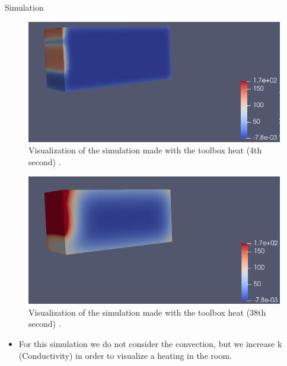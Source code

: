 \begin{frame}[allowframebreaks]{Simulation}
\begin{minipage}{0.48\linewidth}
    \begin{figure}
        \centering
        \includegraphics[width=\linewidth]{"images/enkf/Simulation_1.jpg"}
        \caption{Visualization of the simulation made with the toolbox heat (4th second) .}
    \end{figure}
\end{minipage} \;
\begin{minipage}{0.46\linewidth}
    \begin{figure}
        \centering
        \includegraphics[width=\linewidth]{"images/enkf/Simulation_2.jpg"}
        \caption{Visualization of the simulation made with the toolbox heat (38th second) .}
    \end{figure}
\end{minipage}
\begin{itemize}
    \item For this simulation we do not consider the convection, but we increase k (Conductivity) in order to visualize a heating in the room.
\end{itemize}

\end{frame}
    



